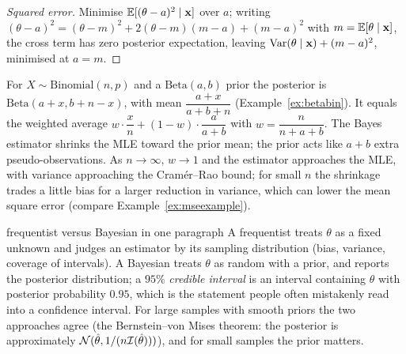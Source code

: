 \begin{proof}[Squared error]
Minimise $\mathbb{E}[(\theta-a)^2\mid\mathbf{x}]$ over $a$; writing $(\theta-a)^2=(\theta-m)^2+2(\theta-m)(m-a)+(m-a)^2$ with $m=\mathbb{E}[\theta\mid\mathbf{x}]$, the cross term has zero posterior expectation, leaving $\operatorname{Var}(\theta\mid\mathbf{x})+(m-a)^2$, minimised at $a=m$.
\end{proof}

\begin{example}
For $X\sim\mathrm{Binomial}(n,p)$ and a $\mathrm{Beta}(a,b)$ prior the posterior is $\mathrm{Beta}(a+x,b+n-x)$, with mean $\dfrac{a+x}{a+b+n}$ (Example~\ref{ex:betabin}). It equals the weighted average $w\cdot\dfrac xn+(1-w)\cdot\dfrac a{a+b}$ with $w=\dfrac n{n+a+b}$. The Bayes estimator shrinks the MLE toward the prior mean; the prior acts like $a+b$ extra pseudo-observations. As $n\to\infty$, $w\to1$ and the estimator approaches the MLE, with variance approaching the Cram\'er--Rao bound; for small $n$ the shrinkage trades a little bias for a larger reduction in variance, which can lower the mean square error (compare Example~\ref{ex:mseexample}).
\end{example}

\begin{interview}{frequentist versus Bayesian in one paragraph}
A frequentist treats $\theta$ as a fixed unknown and judges an estimator by its sampling distribution (bias, variance, coverage of intervals). A Bayesian treats $\theta$ as random with a prior, and reports the posterior distribution; a $95\%$ \emph{credible interval} is an interval containing $\theta$ with posterior probability $0.95$, which is the statement people often mistakenly read into a confidence interval. For large samples with smooth priors the two approaches agree (the Bernstein--von Mises theorem: the posterior is approximately $\mathcal{N}(\hat\theta,1/(n\mathcal{I}(\hat\theta)))$), and for small samples the prior matters.
\end{interview}

